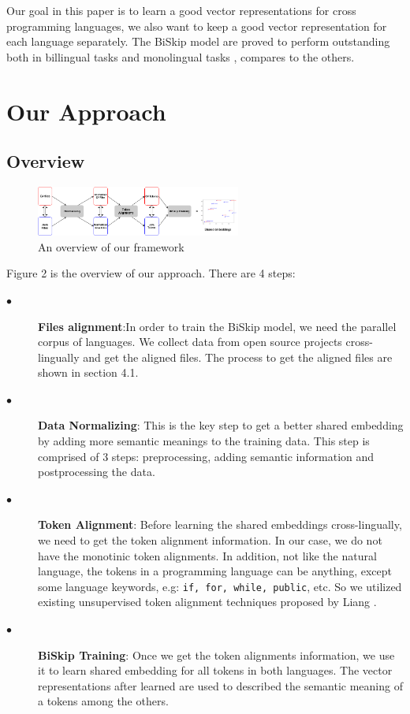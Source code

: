 Our goal in this paper is to learn a good vector representations for cross programming languages, we also want to keep a good vector representation for each language separately. The BiSkip model are proved to perform outstanding both in billingual tasks and monolingual tasks \cite{luong2015bilingual}, compares to the others.

\section{Our Approach}
\subsection{Overview}

\begin{figure}[t!]
	\includegraphics[width=0.60\textwidth]{approach}
	\caption{An overview of our framework}
	\label{fig:approach}
\end{figure}



Figure 2 is the overview of our approach. There are 4 steps:
\begin{description}
    \item [$\bullet$] \textbf{Files alignment}:In order to train the BiSkip model, we need the parallel corpus of languages. We collect data from open source projects cross-lingually and get the aligned files. The process to get the aligned files are shown in section 4.1.
	\item [$\bullet$]\textbf{Data Normalizing}: This is the key step to get a better shared embedding by adding more semantic meanings to the training data. This step is comprised of 3 steps: preprocessing, adding semantic information and postprocessing the data.
	\item [$\bullet$] \textbf{Token Alignment}: Before learning the shared embeddings cross-lingually, we need to get the token alignment information. In our case, we do not have the monotinic token alignments. In addition, not like the natural language, the tokens in a programming language can be anything, except some language keywords, e.g: \texttt{if, for, while, public}, etc. So we utilized existing unsupervised token alignment techniques proposed by Liang \cite{liang2006alignment}.
	\item [$\bullet$] \textbf{BiSkip Training}: Once we get the token alignments information, we use it to learn shared embedding for all tokens in both languages. The vector representations after learned are used to described the semantic meaning of a tokens among the others.
	
	
\end{description}




